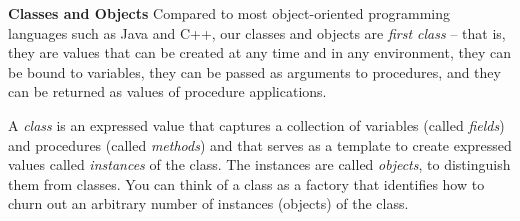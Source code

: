 \begin{minipage}[t]{\sw}
\slidenumber
\LARGE
{\bf Classes and Objects}\exx
Compared to most object-oriented programming languages
such as Java and C++, our classes and objects are
{\em first class} -- that is,
they are values that can be created at any time and in any environment,
they can be bound to variables,
they can be passed as arguments to procedures,
and they can be returned as values of procedure applications.\exx

A {\em class} is an expressed value
that captures a collection
of variables (called {\em fields})
and procedures (called {\em methods})
and that serves as a template
to create expressed values called {\em instances} of the class.
The instances are called {\em objects},
to distinguish them from classes.
You can think of a class as a factory
that identifies how to churn out
an arbitrary number of instances (objects) of the class.
\end{minipage}
